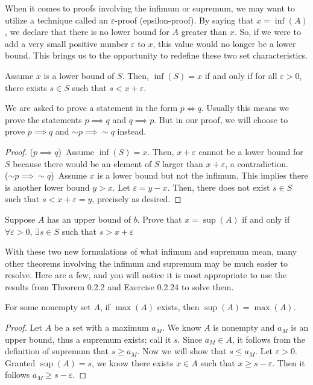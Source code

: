 When it comes to proofs involving the infimum or supremum, we may want to utilize a technique called an $\varepsilon$-proof (epsilon-proof). By saying that $x=\inf(A)$, we declare that there is no lower bound for $A$ greater than $x$. So, if we were to add a very small positive number $\varepsilon$ to $x$, this value would no longer be a lower bound. This brings us to the opportunity to redefine these two set characteristics. \\

\begin{theorem}
    Assume $x$ is a lower bound of $S$. Then, $\inf(S)=x$ if and only if for all $\varepsilon>0$, there exists $s\in S$ such that $s<x+\varepsilon$.
\end{theorem}

We are asked to prove a statement in the form $p\iff q$. Usually this means we prove the statements $p\implies q$ and $q \implies p$. But in our proof, we will choose to prove $p\implies q$ and $\sim p \implies \sim q$ instead. 

\begin{proof}
    ($p\implies q$)\ Assume $\inf(S)=x$. Then, $x+\varepsilon$ cannot be a lower bound for $S$ because there would be an element of $S$ larger than $x+\varepsilon$, a contradiction.\\
   ($\sim p \implies \sim q$)\ Assume $x$ is a lower bound but not the infimum. This implies there is another lower bound $y>x$. Let $\varepsilon=y-x$. Then, there does not exist $s\in S$ such that $s<x+\varepsilon=y$, precisely as desired. 
\end{proof}

\begin{exercise}
    Suppose $A$ has an upper bound of $b$. Prove that $x=\sup(A)$ if and only if $\forall\varepsilon>0,\, \exists s\in S$ such that $s>x+\varepsilon$
\end{exercise}

With these two new formulations of what infimum and supremum mean, many other theorems involving the infimum and supremum may be much easier to resolve. Here are a few, and you will notice it is most appropriate to use the results from Theorem 0.2.2 and Exercise 0.2.24 to solve them. \\

\begin{theorem}
    For some nonempty set $A$, if $\max(A)$ exists, then $\sup(A)=\max(A)$. 
\end{theorem}
\begin{proof}
    Let $A$ be a set with a maximum $a_M$. We know $A$ is nonempty and $a_M$ is an upper bound, thus a supremum exists; call it $s$. Since $a_M\in A$, it follows from the definition of supremum that $s\geq a_M$. Now we will show that $s\leq a_M$. Let $\varepsilon >0$. Granted $\sup(A)=s$, we know there exists $x\in A$ such that $x\geq s-\varepsilon$. Then it follows $a_M \geq s-\varepsilon$.
\end{proof}

